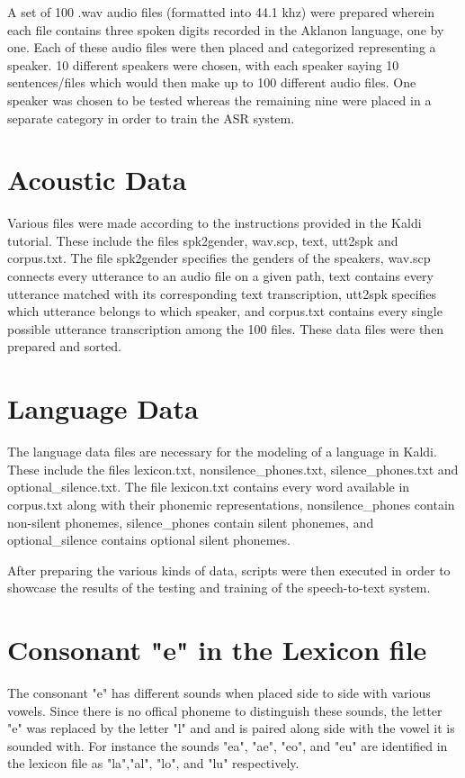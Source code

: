A set of 100 .wav audio files (formatted into 44.1 khz) were prepared wherein each file contains three spoken digits recorded in the Aklanon language, one by one. Each of these audio files were then placed and categorized representing a speaker. 10 different speakers were chosen, with each speaker saying 10 sentences/files which would then make up to 100 different audio files. One speaker was chosen to be tested whereas the remaining nine were placed in a separate category in order to train the ASR system.

\section{Acoustic Data}

Various files were made according to the instructions provided in the Kaldi tutorial. These include the files spk2gender, wav.scp, text, utt2spk and corpus.txt. The file spk2gender specifies the genders of the speakers, wav.scp connects every utterance to an audio file on a given path, text contains every utterance matched with its corresponding text transcription, utt2spk specifies which utterance belongs to which speaker, and corpus.txt contains every single possible utterance transcription among the 100 files. These data files were then prepared and sorted.

\section{Language Data}

The language data files are necessary for the modeling of a language in Kaldi. These include the files lexicon.txt, nonsilence\_phones.txt, silence\_phones.txt and optional\_silence.txt. The file lexicon.txt contains every word available in corpus.txt along with their phonemic representations, nonsilence\_phones contain non-silent phonemes, silence\_phones contain silent phonemes, and optional\_silence contains optional silent phonemes.

After preparing the various kinds of data, scripts were then executed in order to showcase the results of the testing and training of the speech-to-text system.

\section {Consonant "e" in the Lexicon file}

The consonant "e" has different sounds when placed side to side with various vowels. Since there is no offical phoneme to distinguish these sounds, the letter "e" was replaced by the letter "l" and and is paired along side with the vowel it is sounded with. For instance the sounds "ea", "ae", "eo", and "eu" are identified in the lexicon file as "la","al", "lo", and "lu" respectively.


